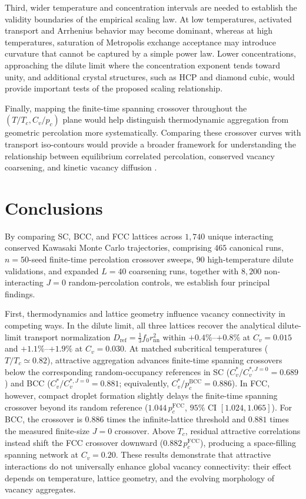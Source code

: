 \documentclass[aps,pre,reprint,superscriptaddress,amsmath,amssymb,floatfix]{revtex4-2}
\begin{document}
Third, wider temperature and concentration intervals are needed to establish the validity boundaries of the empirical scaling law. At low temperatures, activated transport and Arrhenius behavior may become dominant, whereas at high temperatures, saturation of Metropolis exchange acceptance may introduce curvature that cannot be captured by a simple power law. Lower concentrations, approaching the dilute limit where the concentration exponent tends toward unity, and additional crystal structures, such as HCP and diamond cubic, would provide important tests of the proposed scaling relationship.

Finally, mapping the finite-time spanning crossover throughout the $(T/T_c,C_v/p_c)$ plane would help distinguish thermodynamic aggregation from geometric percolation more systematically. Comparing these crossover curves with transport iso-contours would provide a broader framework for understanding the relationship between equilibrium correlated percolation, conserved vacancy coarsening, and kinetic vacancy diffusion \cite{Kertesz1989,DOnorioDeMeo1990,Zhu2026}.


\section{Conclusions}
\label{sec:conclusions}

By comparing SC, BCC, and FCC lattices across $1{,}740$ unique interacting conserved Kawasaki Monte Carlo trajectories, comprising $465$ canonical runs, $n=50$-seed finite-time percolation crossover sweeps, $90$ high-temperature dilute validations, and expanded $L=40$ coarsening runs, together with $8{,}200$ non-interacting $J=0$ random-percolation controls, we establish four principal findings.

First, thermodynamics and lattice geometry influence vacancy connectivity in competing ways. In the dilute limit, all three lattices recover the analytical dilute-limit transport normalization $D_{\mathrm{ref}}=\frac{1}{3}f_0r_{\mathrm{nn}}^2$ within $+0.4\%$--$+0.8\%$ at $C_v=0.015$ and $+1.1\%$--$+1.9\%$ at $C_v=0.030$. At matched subcritical temperatures ($T/T_c\simeq0.82$), attractive aggregation advances finite-time spanning crossovers below the corresponding random-occupancy references in SC ($C_v^*/C_v^{*,J=0}=0.689$) and BCC ($C_v^*/C_v^{*,J=0}=0.881$; equivalently, $C_v^*/p_c^{\mathrm{BCC}}=0.886$). In FCC, however, compact droplet formation slightly delays the finite-time spanning crossover beyond its random reference ($1.044\,p_c^{\mathrm{FCC}}$, $95\%$ CI $[1.024,1.065]$). For BCC, the crossover is $0.886$ times the infinite-lattice threshold and $0.881$ times the measured finite-size $J=0$ crossover. Above $T_c$, residual attractive correlations instead shift the FCC crossover downward ($0.882\,p_c^{\mathrm{FCC}}$), producing a space-filling spanning network at $C_v=0.20$. These results demonstrate that attractive interactions do not universally enhance global vacancy connectivity: their effect depends on temperature, lattice geometry, and the evolving morphology of vacancy aggregates.
\end{document}
